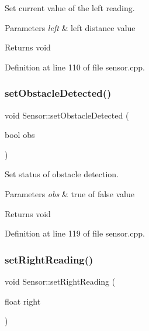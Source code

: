 Set current value of the left reading. 


\begin{DoxyParams}{Parameters}
{\em left} & left distance value \\
\hline
\end{DoxyParams}
\begin{DoxyReturn}{Returns}
void 
\end{DoxyReturn}


Definition at line 110 of file sensor.\+cpp.

\mbox{\label{class_sensor_ae3914c5ebf7891ec734c4d17e7c4cd3d}} 
\subsubsection{\texorpdfstring{set\+Obstacle\+Detected()}{setObstacleDetected()}}
{\footnotesize\ttfamily void Sensor\+::set\+Obstacle\+Detected (\begin{DoxyParamCaption}\item[{bool}]{obs }\end{DoxyParamCaption})}



Set status of obstacle detection. 


\begin{DoxyParams}{Parameters}
{\em obs} & true of false value \\
\hline
\end{DoxyParams}
\begin{DoxyReturn}{Returns}
void 
\end{DoxyReturn}


Definition at line 119 of file sensor.\+cpp.

\mbox{\label{class_sensor_a6549b1585b750c48673def64a199bac1}} 
\subsubsection{\texorpdfstring{set\+Right\+Reading()}{setRightReading()}}
{\footnotesize\ttfamily void Sensor\+::set\+Right\+Reading (\begin{DoxyParamCaption}\item[{float}]{right }\end{DoxyParamCaption})}




